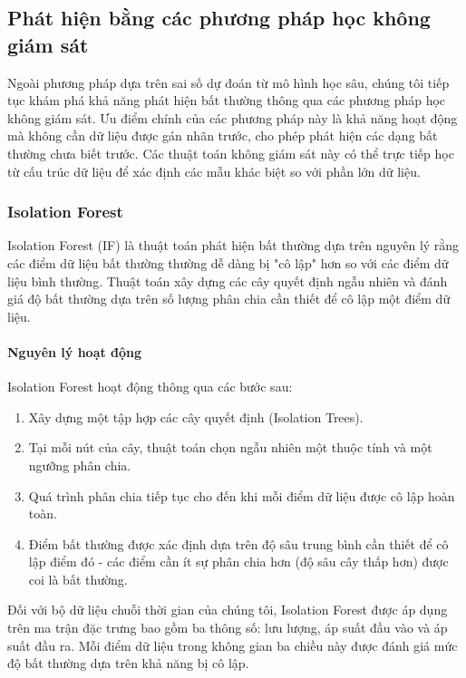 \subsection{Phát hiện bằng các phương pháp học không giám sát}

Ngoài phương pháp dựa trên sai số dự đoán từ mô hình học sâu, chúng tôi tiếp tục khám phá khả năng phát hiện bất thường thông qua các phương pháp học không giám sát. Ưu điểm chính của các phương pháp này là khả năng hoạt động mà không cần dữ liệu được gán nhãn trước, cho phép phát hiện các dạng bất thường chưa biết trước. Các thuật toán không giám sát này có thể trực tiếp học từ cấu trúc dữ liệu để xác định các mẫu khác biệt so với phần lớn dữ liệu.

\subsubsection{Isolation Forest}

Isolation Forest (IF) là thuật toán phát hiện bất thường dựa trên nguyên lý rằng các điểm dữ liệu bất thường thường dễ dàng bị "cô lập" hơn so với các điểm dữ liệu bình thường. Thuật toán xây dựng các cây quyết định ngẫu nhiên và đánh giá độ bất thường dựa trên số lượng phân chia cần thiết để cô lập một điểm dữ liệu.

\paragraph{Nguyên lý hoạt động}
Isolation Forest hoạt động thông qua các bước sau:
\begin{enumerate}
    \item Xây dựng một tập hợp các cây quyết định (Isolation Trees).
    \item Tại mỗi nút của cây, thuật toán chọn ngẫu nhiên một thuộc tính và một ngưỡng phân chia.
    \item Quá trình phân chia tiếp tục cho đến khi mỗi điểm dữ liệu được cô lập hoàn toàn.
    \item Điểm bất thường được xác định dựa trên độ sâu trung bình cần thiết để cô lập điểm đó - các điểm cần ít sự phân chia hơn (độ sâu cây thấp hơn) được coi là bất thường.
\end{enumerate}

Đối với bộ dữ liệu chuỗi thời gian của chúng tôi, Isolation Forest được áp dụng trên ma trận đặc trưng bao gồm ba thông số: lưu lượng, áp suất đầu vào và áp suất đầu ra. Mỗi điểm dữ liệu trong không gian ba chiều này được đánh giá mức độ bất thường dựa trên khả năng bị cô lập.

